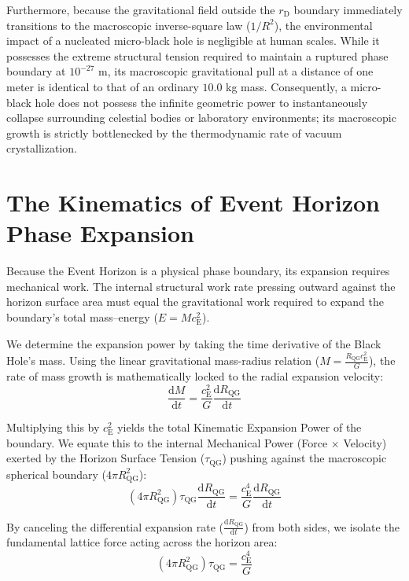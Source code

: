 Furthermore, because the gravitational field outside the $r_{\mathrm{D}}$ boundary immediately transitions to the macroscopic inverse-square law ($1/R^2$), the environmental impact of a nucleated micro-black hole is negligible at human scales. While it possesses the extreme structural tension required to maintain a ruptured phase boundary at $10^{-27}$ m, its macroscopic gravitational pull at a distance of one meter is identical to that of an ordinary $10.0$ kg mass. Consequently, a micro-black hole does not possess the infinite geometric power to instantaneously collapse surrounding celestial bodies or laboratory environments; its macroscopic growth is strictly bottlenecked by the thermodynamic rate of vacuum crystallization.

\section{The Kinematics of Event Horizon Phase Expansion}
Because the Event Horizon is a physical phase boundary, its expansion requires mechanical work. The internal structural work rate pressing outward against the horizon surface area must equal the gravitational work required to expand the boundary's total mass--energy ($E = M c_{\mathrm{E}}^2$).

We determine the expansion power by taking the time derivative of the Black Hole's mass. Using the linear gravitational mass-radius relation ($M = \frac{R_{\mathrm{QG}} c_{\mathrm{E}}^2}{G}$), the rate of mass growth is mathematically locked to the radial expansion velocity:
\begin{equation}
    \frac{\mathrm{d}M}{\mathrm{d}t} = \frac{c_{\mathrm{E}}^2}{G} \frac{\mathrm{d}R_{\mathrm{QG}}}{\mathrm{d}t}
\end{equation}

Multiplying this by $c_{\mathrm{E}}^2$ yields the total Kinematic Expansion Power of the boundary. We equate this to the internal Mechanical Power (Force $\times$ Velocity) exerted by the Horizon Surface Tension ($\tau_{\mathrm{QG}}$) pushing against the macroscopic spherical boundary ($4\pi R_{\mathrm{QG}}^2$):
\begin{equation}
    (4\pi R_{\mathrm{QG}}^2) \tau_{\mathrm{QG}} \frac{\mathrm{d}R_{\mathrm{QG}}}{\mathrm{d}t} = \frac{c_{\mathrm{E}}^4}{G} \frac{\mathrm{d}R_{\mathrm{QG}}}{\mathrm{d}t}
\end{equation}

By canceling the differential expansion rate ($\frac{\mathrm{d}R_{\mathrm{QG}}}{\mathrm{d}t}$) from both sides, we isolate the fundamental lattice force acting across the horizon area:
\begin{equation}
    (4\pi R_{\mathrm{QG}}^2) \tau_{\mathrm{QG}} = \frac{c_{\mathrm{E}}^4}{G}
\end{equation}

